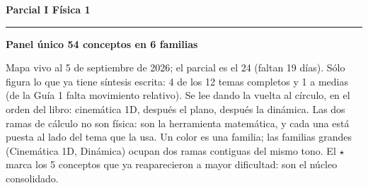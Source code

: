 \documentclass[11pt]{article}
\begin{document}
\thispagestyle{fancy}

\begin{center}
    {\fontsize{32}{38}\selectfont\bfseries\color{textgray}
        Parcial I \textemdash{} Física 1\par}
    \vspace{0.35cm}
    {\color{rulegray}\rule{17cm}{0.6pt}\par}
    \vspace{0.35cm}
    {\fontsize{17}{21}\selectfont\bfseries\color{textgray}
        Panel único \textemdash{} 54 conceptos en 6 familias\par}
    \vspace{0.30cm}
    \begin{minipage}{17cm}
    \centering
    {\fontsize{12}{16}\selectfont\color{rulegray}
        Mapa vivo al 5 de septiembre de 2026; el parcial es el 24
        (faltan 19 días). Sólo figura lo que ya tiene síntesis escrita:
        4 de los 12 temas completos y 1 a medias (de la Guía 1 falta
        movimiento relativo). Se lee dando la vuelta al círculo, en el
        orden del libro: cinemática 1D, después el plano, después la
        dinámica. Las dos ramas de cálculo no son física: son la
        herramienta matemática, y cada una está puesta al lado del tema
        que la usa. Un color es una familia; las familias grandes
        (Cinemática 1D, Dinámica) ocupan dos ramas contiguas del mismo
        tono. El $\star$ marca los 5 conceptos que ya reaparecieron a
        mayor dificultad: son el núcleo consolidado.\par}
    \end{minipage}
\end{center}

\vspace{0.15cm}
\end{document}
